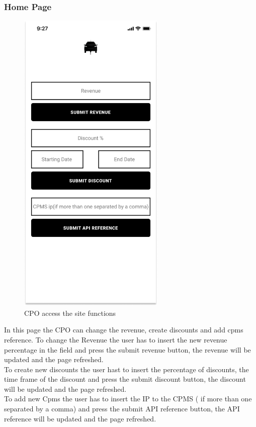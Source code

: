 \subsubsection{Home Page}
\begin{figure}[H]
    \centering
    \includegraphics[keepaspectratio, height=15cm]{Mockup/CPOAppInterface/Homepage.png}
    \caption{\ac{CPO} access the site functions}
    \label{site:Homepage}
\end{figure}
In this page the \ac{CPO} can change the revenue, create discounts and add cpms reference.
To change the Revenue the user has to insert the new revenue percentage in the field and press the submit revenue button, the revenue will be updated and the page refreshed.\\
To create new discounts the user hast to insert the percentage of discounts, the time frame of the discount and press the submit discount button, the discount will be updated and the page refreshed.\\
To add new Cpms the user has to insert the IP to the \ac{CPMS} ( if more than one separated by a comma) and press the submit \ac{API} reference button, the \ac{API} reference will be updated and the page refreshed.\\

